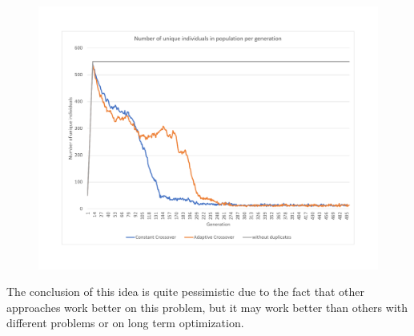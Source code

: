 \begin{figure}
	\centering
	\includegraphics[width=\textwidth]{images/UniqIndividualsPerGeneration3.pdf}
	\caption[]{}
	\label{fig:UniqIndividualsPerGeneration3}
\end{figure}   

The conclusion of this idea is quite pessimistic due to the fact that other approaches work better on this problem, but it may work better than others with different problems or on long term optimization.


